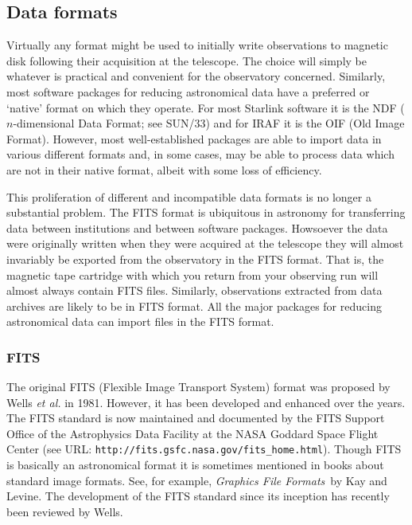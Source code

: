 \documentclass[twoside,11pt]{article}
\newcommand{\htmladdnormallink}[2]{#1}
\newcommand{\xref}[3]{#1}
\newcommand{\xlabel}[1]{}
\begin{document}
\subsection{\label{FORMAT}Data formats}

Virtually any format might be used to initially write observations to
magnetic disk following their acquisition at the telescope.  The choice
will simply be whatever is practical and convenient for the observatory
concerned.  Similarly, most software packages for reducing astronomical
data have a preferred or `native' format on which they operate.  For most
Starlink software it is the NDF ($n$-dimensional Data Format; see
\xref{SUN/33}{sun33}{}\cite{SUN33}) and for IRAF it is the OIF (Old
Image Format).  However, most well-established packages are able to
import data in various different formats and, in some cases, may be able
to process data which are not in their native format, albeit with some loss
of efficiency.

This proliferation of different and incompatible data formats is no longer
a substantial problem.  The FITS format is ubiquitous in astronomy for
transferring data between institutions and between software packages.
Howsoever the data were originally written when they were acquired at the
telescope they will almost invariably be exported from the observatory in
the FITS format.  That is, the magnetic tape cartridge with which you return
from your observing run will almost always contain FITS files.  Similarly,
observations extracted from 
\htmladdnormallink{data archives}{http://www.starlink.rl.ac.uk/archives/}
are likely to be in FITS format.  All the major packages for reducing
astronomical data can import files in the FITS format.

\subsubsection{\xlabel{FITS}FITS}

The original FITS (Flexible Image Transport System) format was proposed by
Wells {\it et al.}\/\cite{WELLS81} in 1981.  However, it has been developed
and enhanced over the years.  The FITS standard is now maintained and
documented by the FITS Support Office of the Astrophysics Data Facility at
the NASA Goddard Space Flight Center (see URL:  \newline
\htmladdnormallink{ {\tt http://fits.gsfc.nasa.gov/fits\_home.html}}
{http://fits.gsfc.nasa.gov/fits_home.html}).  Though FITS is
basically an astronomical format it is sometimes mentioned in books about
standard image formats.  See, for example, {\it Graphics File Formats}\, by
Kay and Levine\cite{KAY95}.  The development of the FITS standard since
its inception has recently been reviewed by Wells\cite{WELLS00}.
\end{document}
